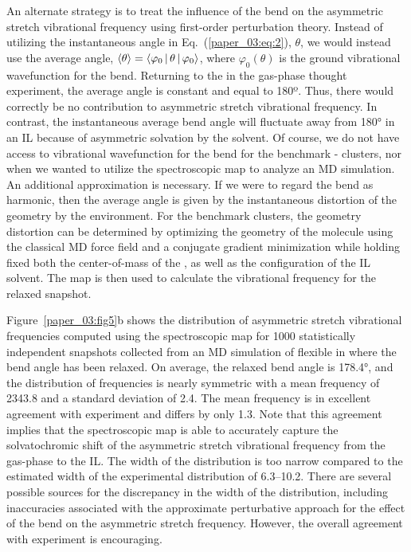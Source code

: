 \documentclass[%
  class = book,%
  crop = false,%
  float = true,%
  multi = true,%
  preview = false,%
]{standalone}
\begin{document}
An alternate strategy is to treat the influence of the  bend on the asymmetric stretch vibrational frequency using first-order perturbation theory. Instead of utilizing the instantaneous  angle in Eq.~(\ref{paper_03:eq:2}), \(\theta\), we would instead use the average angle, \(\Braket{\theta} = \Braket{ \varphi_{0} | \theta | \varphi_{0} }\), where \(\varphi_{0}(\theta)\) is the ground vibrational wavefunction for the  bend. Returning to the  in the gas-phase thought experiment, the average angle is constant and equal to 180º. Thus, there would correctly be no contribution to  asymmetric stretch vibrational frequency. In contrast, the instantaneous average bend angle will fluctuate away from \ang{180} in an IL because of asymmetric solvation by the solvent. Of course, we do not have access to vibrational wavefunction for the  bend for the benchmark -\ce{[C4C1im][PF6]} clusters, nor when we wanted to utilize the spectroscopic map to analyze an MD simulation. An additional approximation is necessary. If we were to regard the  bend as harmonic, then the average angle is given by the instantaneous distortion of the  geometry by the environment. For the benchmark clusters, the geometry distortion can be determined by optimizing the geometry of the  molecule using the classical MD force field and a conjugate gradient minimization while holding fixed both the center-of-mass of the , as well as the configuration of the IL solvent. The map is then used to calculate the vibrational frequency for the relaxed snapshot.

Figure~\ref{paper_03:fig5}b shows the distribution of  asymmetric stretch vibrational frequencies computed using the spectroscopic map for \num{1000} statistically independent snapshots collected from an MD simulation of flexible  in \ce{[C4C1im][PF6]} where the  bend angle has been relaxed. On average, the relaxed bend angle is \ang{178.4}, and the distribution of frequencies is nearly symmetric with a mean frequency of \SI{2343.8}{\wavenumber} and a standard deviation of \SI{2.4}{\wavenumber}. The mean frequency is in excellent agreement with experiment and differs by only \SI{1.3}{\wavenumber}. Note that this agreement implies that the spectroscopic map is able to accurately capture the solvatochromic shift of the  asymmetric stretch vibrational frequency from the gas-phase to the \ce{[C4C1im][PF6]} IL. The width of the distribution is too narrow compared to the estimated width of the experimental distribution of \SIrange{6.3}{10.2}{\wavenumber}. There are several possible sources for the discrepancy in the width of the distribution, including inaccuracies associated with the approximate perturbative approach for the effect of the bend on the asymmetric stretch frequency. However, the overall agreement with experiment is encouraging.
\end{document}

